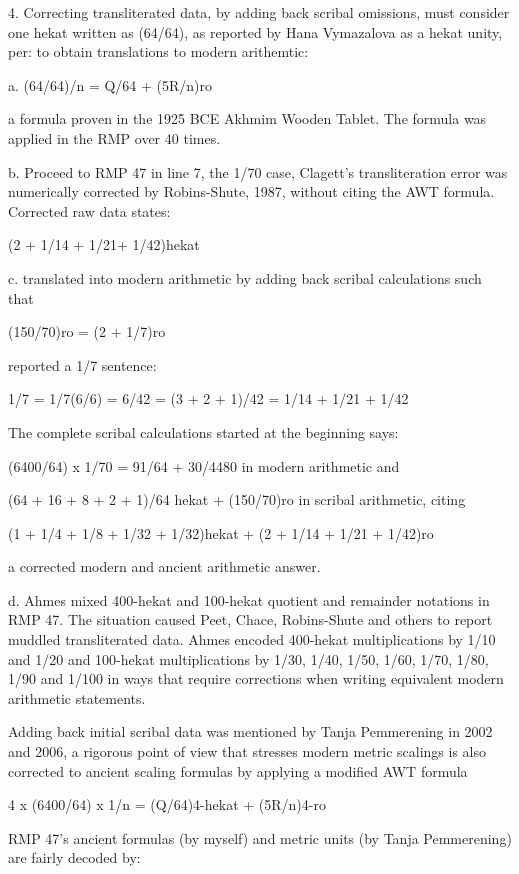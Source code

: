 \documentclass[12pt]{article}
\begin{document}
4. Correcting transliterated data, by adding back scribal omissions, must consider one hekat written as (64/64), as reported by Hana Vymazalova as a hekat unity, per:
 to obtain translations to modern arithemtic:
 
a. (64/64)/n = Q/64 + (5R/n)ro

a formula proven in the 1925 BCE Akhmim Wooden Tablet. The formula was applied in the RMP over 40 times.

b. Proceed to RMP 47 in line 7, the 1/70 case, Clagett's transliteration error was numerically corrected by Robins-Shute, 1987, without citing the AWT formula. Corrected raw data states: 

(2 + 1/14 + 1/21+ 1/42)hekat 

c. translated into modern arithmetic by adding back scribal calculations such that

(150/70)ro  = (2 + 1/7)ro 

reported a 1/7 sentence:

1/7 = 1/7(6/6) = 6/42 = (3 + 2 + 1)/42 = 1/14 + 1/21 + 1/42  

The complete scribal calculations started at the beginning says:

(6400/64) x 1/70 =  91/64 + 30/4480 in modern arithmetic and

(64 + 16 + 8 + 2 + 1)/64 hekat + (150/70)ro in scribal arithmetic, citing

(1 + 1/4 + 1/8 + 1/32 + 1/32)hekat + (2 + 1/14 + 1/21 + 1/42)ro 

a corrected modern and ancient arithmetic answer.   

d. Ahmes mixed 400-hekat and 100-hekat quotient and remainder notations in RMP 47. The situation caused Peet, Chace, Robins-Shute and others to report muddled transliterated data. Ahmes encoded 400-hekat multiplications by 1/10 and 1/20 and 100-hekat multiplications by 1/30, 1/40, 1/50, 1/60, 1/70, 1/80, 1/90 and 1/100 in ways that require corrections when writing equivalent modern arithmetic statements. 

Adding back initial scribal data was mentioned by Tanja Pemmerening in 2002 and 2006, a rigorous point of view that stresses modern metric scalings is also corrected to ancient scaling formulas by applying a modified AWT formula

4 x (6400/64) x 1/n = (Q/64)4-hekat + (5R/n)4-ro

RMP 47's ancient formulas (by myself)  and metric units (by Tanja Pemmerening) are fairly decoded by: 
\end{document}
